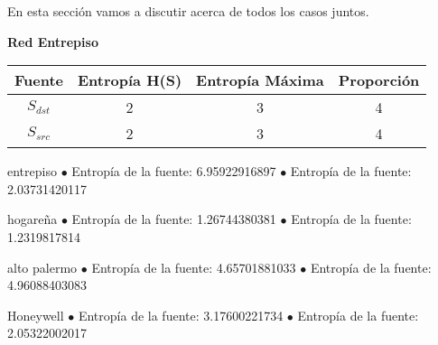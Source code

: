 En esta sección vamos a discutir acerca de todos los casos juntos.

\textbf{Red Entrepiso}

\begin{tabular}{|c|c|c|c|}
\hline
Fuente&Entropía H(S)&Entropía Máxima&Proporción\\
\hline
$S_{dst}$&2&3&4\\
$S_{src}$&2&3&4\\ 
\hline
\end{tabular}


entrepiso
$\bullet$ Entropía de la fuente: 6.95922916897
$\bullet$ Entropía de la fuente: 2.03731420117

hogareña
$\bullet$ Entropía de la fuente: 1.26744380381
$\bullet$ Entropía de la fuente: 1.2319817814

alto palermo
$\bullet$ Entropía de la fuente: 4.65701881033
$\bullet$ Entropía de la fuente: 4.96088403083

Honeywell
$\bullet$ Entropía de la fuente: 3.17600221734
$\bullet$ Entropía de la fuente: 2.05322002017
